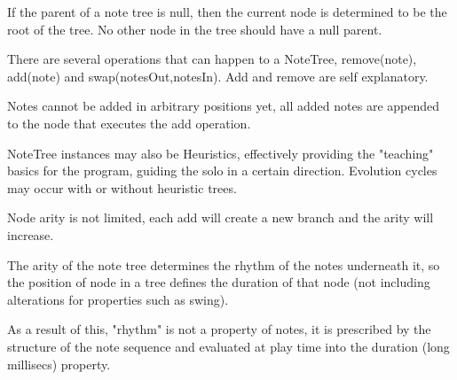 \documentclass[11pt]{report}
\begin{document}
{{{{ If the parent of a note tree is null, then the current node
 is determined to be the root of the tree. No other node in the
 tree should have a null parent.
 
 There are several operations that can happen to a NoteTree,
 remove(note), add(note) and swap(notesOut,notesIn). Add and remove 
 are self explanatory.
 
 Notes cannot be added in arbitrary positions yet, all added notes are
 appended to the node that executes the add operation.
 
 NoteTree instances may also be Heuristics, effectively 
 providing the "teaching" basics for the program, guiding 
 the solo in a certain direction. Evolution cycles may occur 
 with or without heuristic trees.
 
 Node arity is not limited, each add will create a new branch and
 the arity will increase.
 
 The arity of the note tree determines the rhythm of the 
 notes underneath it, so the position of node in a tree defines
 the duration of that node (not including alterations for 
 properties such as swing). 
 
 As a result of this, "rhythm" is not a property of notes, it is
 prescribed by the structure of the note sequence and evaluated at
 play time into the duration (long millisecs) property.
 
}}}}
\end{document}
